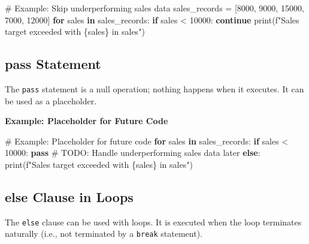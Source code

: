 \documentclass[
  letterpaper,
  DIV=11,
  numbers=noendperiod]{scrreprt}
\newenvironment{Shaded}{\begin{snugshade}}{\end{snugshade}}
\newcommand{\AlertTok}[1]{\textcolor[rgb]{0.68,0.00,0.00}{#1}}
\newcommand{\BuiltInTok}[1]{\textcolor[rgb]{0.00,0.23,0.31}{#1}}
\newcommand{\CommentTok}[1]{\textcolor[rgb]{0.37,0.37,0.37}{#1}}
\newcommand{\ControlFlowTok}[1]{\textcolor[rgb]{0.00,0.23,0.31}{\textbf{#1}}}
\newcommand{\DecValTok}[1]{\textcolor[rgb]{0.68,0.00,0.00}{#1}}
\newcommand{\KeywordTok}[1]{\textcolor[rgb]{0.00,0.23,0.31}{\textbf{#1}}}
\newcommand{\NormalTok}[1]{\textcolor[rgb]{0.00,0.23,0.31}{#1}}
\newcommand{\OperatorTok}[1]{\textcolor[rgb]{0.37,0.37,0.37}{#1}}
\newcommand{\SpecialCharTok}[1]{\textcolor[rgb]{0.37,0.37,0.37}{#1}}
\newcommand{\SpecialStringTok}[1]{\textcolor[rgb]{0.13,0.47,0.30}{#1}}
\begin{document}
\begin{Shaded}
\begin{Highlighting}[]
\CommentTok{\# Example: Skip underperforming sales data}
\NormalTok{sales\_records }\OperatorTok{=}\NormalTok{ [}\DecValTok{8000}\NormalTok{, }\DecValTok{9000}\NormalTok{, }\DecValTok{15000}\NormalTok{, }\DecValTok{7000}\NormalTok{, }\DecValTok{12000}\NormalTok{]}
\ControlFlowTok{for}\NormalTok{ sales }\KeywordTok{in}\NormalTok{ sales\_records:}
    \ControlFlowTok{if}\NormalTok{ sales }\OperatorTok{\textless{}} \DecValTok{10000}\NormalTok{:}
        \ControlFlowTok{continue}
    \BuiltInTok{print}\NormalTok{(}\SpecialStringTok{f"Sales target exceeded with }\SpecialCharTok{\{}\NormalTok{sales}\SpecialCharTok{\}}\SpecialStringTok{ in sales"}\NormalTok{)}
\end{Highlighting}
\end{Shaded}

\subsection{pass Statement}\label{pass-statement}

The \texttt{pass} statement is a null operation; nothing happens when it
executes. It can be used as a placeholder.

\textbf{Example: Placeholder for Future Code}

\begin{Shaded}
\begin{Highlighting}[]
\CommentTok{\# Example: Placeholder for future code}
\ControlFlowTok{for}\NormalTok{ sales }\KeywordTok{in}\NormalTok{ sales\_records:}
    \ControlFlowTok{if}\NormalTok{ sales }\OperatorTok{\textless{}} \DecValTok{10000}\NormalTok{:}
        \ControlFlowTok{pass}  \CommentTok{\# }\AlertTok{TODO}\CommentTok{: Handle underperforming sales data later}
    \ControlFlowTok{else}\NormalTok{:}
        \BuiltInTok{print}\NormalTok{(}\SpecialStringTok{f"Sales target exceeded with }\SpecialCharTok{\{}\NormalTok{sales}\SpecialCharTok{\}}\SpecialStringTok{ in sales"}\NormalTok{)}
\end{Highlighting}
\end{Shaded}

\subsection{else Clause in Loops}\label{else-clause-in-loops}

The \texttt{else} clause can be used with loops. It is executed when the
loop terminates naturally (i.e., not terminated by a \texttt{break}
statement).
\end{document}
